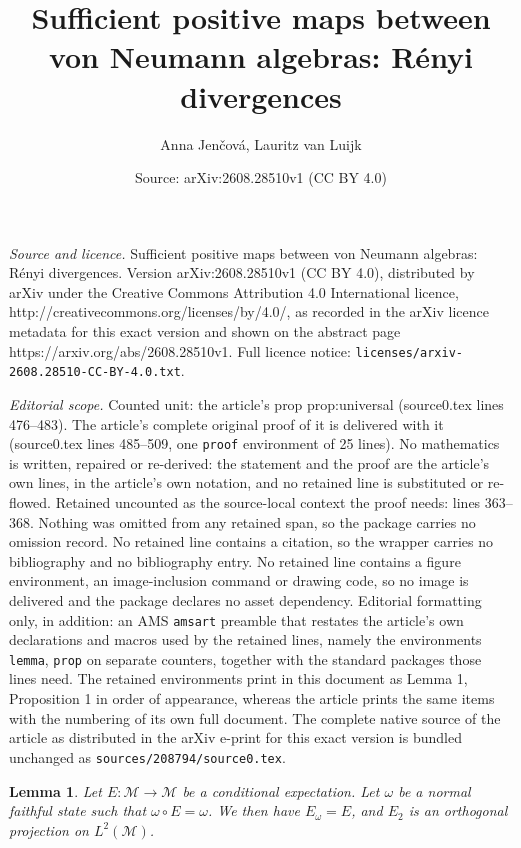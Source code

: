 \documentclass[10pt,a4paper]{amsart}
\title{Sufficient positive maps between von Neumann algebras: R{\'e}nyi divergences}
\author{Anna Jen\v{c}ov\'a, Lauritz van Luijk}
\date{Source: arXiv:2608.28510v1 (CC BY 4.0)}
\newtheorem{lemma}{Lemma}
\def\Me{\mathcal M}
\begin{document}
\maketitle

\noindent\emph{Source and licence.} Sufficient positive maps between von Neumann algebras: R{\'e}nyi divergences. Version arXiv:2608.28510v1 (CC BY 4.0), distributed by arXiv under the Creative Commons Attribution 4.0 International licence, http://creativecommons.org/licenses/by/4.0/, as recorded in the arXiv licence metadata for this exact version and shown on the abstract page https://arxiv.org/abs/2608.28510v1. Full licence notice: \texttt{licenses/arxiv-2608.28510-CC-BY-4.0.txt}.\par\smallskip

\noindent\textit{Editorial scope.} Counted unit: the article's prop prop:universal (source0.tex lines 476--483). The article's complete original proof of it is delivered with it (source0.tex lines 485--509, one \texttt{proof} environment of 25 lines). No mathematics is written, repaired or re-derived: the statement and the proof are the article's own lines, in the article's own notation, and no retained line is substituted or re-flowed.  Retained uncounted as the source-local context the proof needs: lines 363--368.  Nothing was omitted from any retained span, so the package carries no omission record.  No retained line contains a citation, so the wrapper carries no bibliography and no bibliography entry.  No retained line contains a figure environment, an image-inclusion command or drawing code, so no image is delivered and the package declares no asset dependency.  Editorial formatting only, in addition: an AMS \texttt{amsart} preamble that restates the article's own declarations and macros used by the retained lines, namely the environments \texttt{lemma}, \texttt{prop} on separate counters, together with the standard packages those lines need.  The retained environments print in this document as Lemma 1, Proposition 1 in order of appearance, whereas the article prints the same items with the numbering of its own full document.  The complete native source of the article as distributed in the arXiv e-print for this exact version is bundled unchanged as \texttt{sources/208794/source0.tex}.
\begin{lemma}\label{lemma:idempotent} Let $E:\Me\to \Me$ be a conditional expectation.
Let $\omega$ be a normal faithful state such that $\omega\circ E=\omega$. 
We then have $E_\omega=E$, and $E_2$ is an
 orthogonal projection on $L^2(\Me)$. 

\end{lemma}
\end{document}
